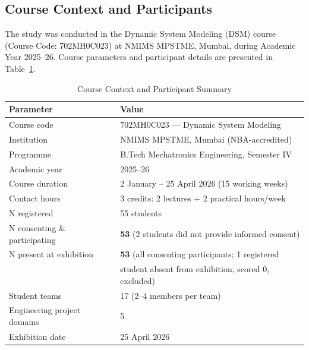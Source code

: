 \documentclass[utf8]{FrontiersinHarvard}
\begin{document}
\subsection{Course Context and Participants}

The study was conducted in the Dynamic System Modeling (DSM) course
(Course Code: 702MH0C023) at NMIMS MPSTME, Mumbai, during Academic Year
2025--26. Course parameters and participant details are presented in
Table~\ref{tab:context}.

\begin{table}[h]
\caption{Course Context and Participant Summary}
\label{tab:context}
\begin{tabular}{ll}
\toprule
\textbf{Parameter} & \textbf{Value} \\
\midrule
Course code                   & 702MH0C023 --- Dynamic System Modeling \\
Institution                   & NMIMS MPSTME, Mumbai (NBA-accredited) \\
Programme                     & B.Tech Mechatronics Engineering, Semester IV \\
Academic year                 & 2025--26 \\
Course duration               & 2 January -- 25 April 2026 (15 working weeks) \\
Contact hours                 & 3 credits: 2 lectures + 2 practical hours/week \\
N registered                  & 55 students \\
N consenting \& participating & \textbf{53} (2 students did not provide informed consent) \\
N present at exhibition       & \textbf{53} (all consenting participants; 1 registered \\
                              & \quad student absent from exhibition, scored 0, excluded) \\
Student teams                 & 17 (2--4 members per team) \\
Engineering project domains   & 5 \\
Exhibition date               & 25 April 2026 \\
\bottomrule
\end{tabular}
\end{table}
\end{document}
